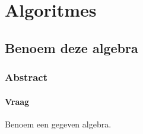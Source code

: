 \documentclass[main.tex]{subfiles}
\begin{document}
\chapter{Algoritmes}
\label{cha:algoritmes}

\newpage
\section{Benoem deze algebra}
\subsection{Abstract}

\subsubsection{Vraag}
\begin{center}
  Benoem een gegeven algebra.
\end{center}
\end{document}
